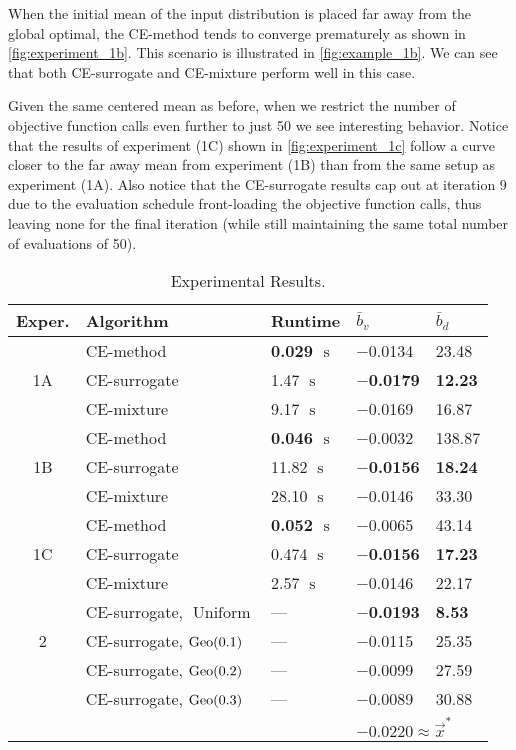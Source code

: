 When the initial mean of the input distribution is placed far away from the global optimal, the CE-method tends to converge prematurely as shown in \cref{fig:experiment_1b}.
This scenario is illustrated in \cref{fig:example_1b}.
We can see that both CE-surrogate and CE-mixture perform well in this case.


Given the same centered mean as before, when we restrict the number of objective function calls even further to just 50 we see interesting behavior.
Notice that the results of experiment (1C) shown in \cref{fig:experiment_1c} follow a curve closer to the far away mean from experiment (1B) than from the same setup as experiment (1A). Also notice that the CE-surrogate results cap out at iteration 9 due to the evaluation schedule front-loading the objective function calls, thus leaving none for the final iteration (while still maintaining the same total number of evaluations of 50).

\begin{table}[!ht]
    \small
    \centering
    \caption{\label{tab:cem_results} Experimental Results.}
    \begin{tabular}{cllll} %
    \toprule
    \textbf{Exper.} & \textbf{Algorithm} & \textbf{Runtime} & $\bar{b}_v$ & $\bar{b}_d$\\
    \midrule
    \multirow{3}{*}{1A} & CE-method & \textbf{0.029 $\operatorname{s}$} & $-$0.0134 & 23.48\\
    &CE-surrogate & 1.47 $\operatorname{s}$ & \textbf{\boldmath$-$0.0179} & \textbf{12.23}\\
    &CE-mixture & 9.17 $\operatorname{s}$ & $-$0.0169 & 16.87\\
    \midrule
    \multirow{3}{*}{1B} & CE-method & \textbf{0.046 $\operatorname{s}$} & $-$0.0032 & 138.87\\
    &CE-surrogate & 11.82 $\operatorname{s}$ & \textbf{\boldmath$-$0.0156} & \textbf{18.24}\\
    &CE-mixture & 28.10 $\operatorname{s}$ & $-$0.0146 & 33.30\\
    \midrule
    \multirow{3}{*}{1C} & CE-method & \textbf{0.052 $\operatorname{s}$} & $-$0.0065 & 43.14\\
    &CE-surrogate & 0.474 $\operatorname{s}$ & \textbf{\boldmath$-$0.0156} & \textbf{17.23}\\
    &CE-mixture & 2.57 $\operatorname{s}$ & $-$0.0146 & 22.17\\
    \midrule
    \multirow{3}{*}{2} & CE-surrogate, $\operatorname{Uniform}$ & --- & \textbf{\boldmath$-$0.0193} & \textbf{8.53}\\
    &CE-surrogate, $\operatorname{Geo}(0.1)$ & {\color{gray}---} & $-$0.0115 & 25.35\\
    &CE-surrogate, $\operatorname{Geo}(0.2)$ & {\color{gray}---} & $-$0.0099 & 27.59\\
    &CE-surrogate, $\operatorname{Geo}(0.3)$ & {\color{gray}---} & $-$0.0089 & 30.88\\
    \bottomrule
    & & & \multicolumn{2}{l}{$-\text{0.0220} \approx\vec{x}^*$}\\
    \end{tabular}
\end{table}


